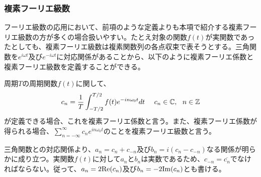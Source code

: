 \documentclass[dvipdfmx, 9pt, a4paper]{jsarticle}
\begin{document}
\subsubsection{複素フーリエ級数}
フーリエ級数の応用において、前項のような定義よりも本項で紹介する複素フーリエ級数の方が多くの場合扱いやすい。たとえ対象の関数$f(t)$が実関数であったとしても、複素フーリエ級数は複素関数列の各点収束で表そうとする。三角関数を$e^{i\omega t}$及び$e^{-i\omega t}$に対応関係があることから、以下のように複素フーリエ係数と複素フーリエ級数を定義することができる。
\begin{tcolorbox}[title=複素フーリエ係数と複素フーリエ級数]
周期$T$の周期関数$f(t)$に関して、
\begin{equation}
c_n = \frac{1}{T}\int_{-T/2}^{T/2} f(t)e^{-in\omega_0t}dt~~~~c_n \in \mathbb{C},~~n \in \mathbb{Z} \notag
\end{equation}
が定義できる場合、これを複素フーリエ係数と言う。また、複素フーリエ係数が得られる場合、$\sum_{n=-\infty}^\infty c_ne^{in\omega_0t}$のことを複素フーリエ級数と言う。
\end{tcolorbox}
三角関数との対応関係より、$a_n=c_n+c_{-n}$及び$b_n=i(c_n-c_{-n})$なる関係が明らかに成り立つ。実関数$f(t)$に対して$a_n$と$b_n$は実数であるため、$c_{-n}=\overline{c_n}$でなければならない。従って、$a_n=2{\rm Re}(c_n)$及び$b_n=-2{\rm Im}(c_n)$とも書ける。
\end{document}
